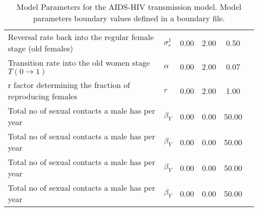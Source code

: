 \begin{table}
\begin{tabular}{p{5cm}lcccc}
Reversal rate back into the regular female stage (old females) & $\sigma^1_r$ & 0.00 & 2.00 & 0.50\\
Transition rate into the old women stage $T(0\rightarrow 1)$ & $\alpha$ & 0.00 & 2.00 & 0.07\\
r factor determining the fraction of reproducing females & $r$ & 0.00 & 2.00 & 1.00\\
Total no of sexual contacts a male has per year & $\beta_Y$ & 0.00 & 0.00 & 50.00\\
Total no of sexual contacts a male has per year & $\beta_Y$ & 0.00 & 0.00 & 50.00\\
Total no of sexual contacts a male has per year & $\beta_Y$ & 0.00 & 0.00 & 50.00\\
Total no of sexual contacts a male has per year & $\beta_Y$ & 0.00 & 0.00 & 50.00\\
\hline\hline
\end{tabular}
\caption{Model Parameters for the AIDS-HIV transmission model. Model parameters boundary values defined in a boundary file.}
\end{table}
